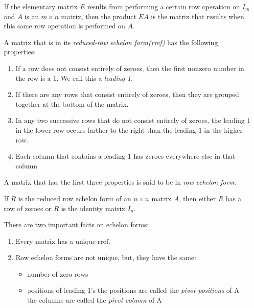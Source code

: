 \documentclass{report}
\begin{document}
		\begin{thm}
			If the elementary matrix $E$ results from performing a certain row operation on $I_m$ and $A$ is an $m \times n$ matrix, then the product $EA$ is the matrix that results when this same row operation is performed on $A$.
		\end{thm}
		
		\begin{defn}
			A matrix that is in its \emph{reduced-row echelon form(rref)} has the following properties:
			\begin{enumerate}
				\item If a row does not consist entirely of zeroes, then the first nonzero number in the row is a 1. We call this a \emph{leading 1}.
				\item If there are any rows that consist entirely of zeroes, then they are grouped together at the bottom of the matrix.
				\item In any two successive rows that do not consist entirely of zeroes, the leading 1 in the lower row occurs farther to the right than the leading 1 in the higher row.
				\item Each column that contains a leading 1 has zeroes everywhere else in that column
			\end{enumerate}
			A matrix that has the first three properties is said to be in \emph{row echelon form}.
		\end{defn}
		
		\begin{thm}
			If $R$ is the reduced row echelon form of an $n \times n$ matrix $A$, then either $R$ has a row of zeroes or $R$ is the identity matrix $I_n$.
		\end{thm}
		
		There are two important facts on echelon forms:
		\begin{enumerate}
			\item Every matrix has a unique rref.
			\item Row echelon forms are not unique, but, they have the same:
			\begin{itemize}
				\item number of zero rows
				\item positions of leading 1's
					\subitem the positions are called the \emph{pivot positions} of A
					\subitem the columns are called the \emph{pivot column} of A
			\end{itemize}
		\end{enumerate}
		
\end{document}
